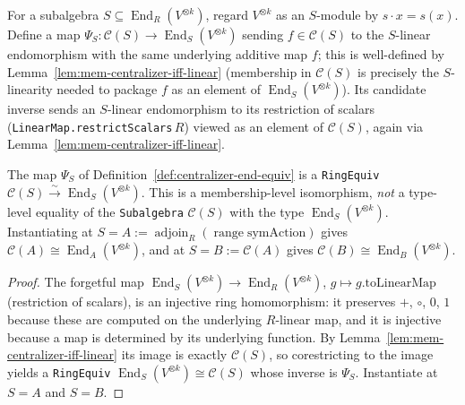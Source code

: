 \begin{definition}
    \label{def:centralizer-end-equiv}
    For a subalgebra $S \subseteq \operatorname{End}_R(V^{\otimes k})$, regard $V^{\otimes k}$ as an
    $S$-module by $s \cdot x = s(x)$. Define a map $\Psi_S : \mathcal{C}(S) \to
    \operatorname{End}_S(V^{\otimes k})$ sending $f \in \mathcal{C}(S)$ to the $S$-linear endomorphism with
    the same underlying additive map $f$; this is well-defined by
    Lemma~\ref{lem:mem-centralizer-iff-linear} (membership in $\mathcal{C}(S)$ is precisely the
    $S$-linearity needed to package $f$ as an element of $\operatorname{End}_S(V^{\otimes k})$). Its
    candidate inverse sends an $S$-linear endomorphism to its restriction of scalars
    (\texttt{LinearMap.restrictScalars}$\,R$) viewed as an element of $\mathcal{C}(S)$, again via
    Lemma~\ref{lem:mem-centralizer-iff-linear}.
\end{definition}

\begin{lemma}
    \label{lem:centralizer-end-equiv-ring}
    The map $\Psi_S$ of Definition~\ref{def:centralizer-end-equiv} is a \texttt{RingEquiv}
    $\mathcal{C}(S) \xrightarrow{\sim} \operatorname{End}_S(V^{\otimes k})$. This is a membership-level
    isomorphism, \emph{not} a type-level equality of the \texttt{Subalgebra} $\mathcal{C}(S)$ with the
    type $\operatorname{End}_S(V^{\otimes k})$. Instantiating at $S = A :=
    \operatorname{adjoin}_R(\operatorname{range}\mathrm{symAction})$ gives $\mathcal{C}(A) \cong
    \operatorname{End}_A(V^{\otimes k})$, and at $S = B := \mathcal{C}(A)$ gives $\mathcal{C}(B) \cong
    \operatorname{End}_B(V^{\otimes k})$.
\end{lemma}
\begin{proof}
    The forgetful map $\operatorname{End}_S(V^{\otimes k}) \to \operatorname{End}_R(V^{\otimes k})$,
    $g \mapsto g.\mathrm{toLinearMap}$ (restriction of scalars), is an injective ring homomorphism: it
    preserves $+$, $\circ$, $0$, $1$ because these are computed on the underlying $R$-linear map, and it is
    injective because a map is determined by its underlying function. By
    Lemma~\ref{lem:mem-centralizer-iff-linear} its image is exactly $\mathcal{C}(S)$, so corestricting to
    the image yields a \texttt{RingEquiv} $\operatorname{End}_S(V^{\otimes k}) \cong \mathcal{C}(S)$ whose
    inverse is $\Psi_S$. Instantiate at $S = A$ and $S = B$.
\end{proof}

